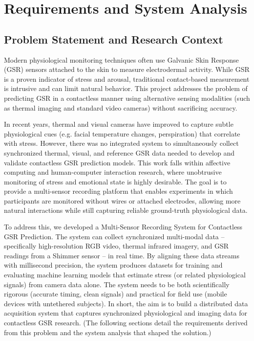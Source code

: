 \label{chap:3}
\chapter{Requirements and System Analysis}

\section{Problem Statement and Research Context}

Modern physiological monitoring techniques often use Galvanic Skin Response (GSR) sensors attached to the skin to measure electrodermal activity. While GSR is a proven indicator of stress and arousal, traditional contact-based measurement is intrusive and can limit natural behavior. This project addresses the problem of predicting GSR in a contactless manner using alternative sensing modalities (such as thermal imaging and standard video cameras) without sacrificing accuracy.

In recent years, thermal and visual cameras have improved to capture subtle physiological cues (e.g. facial temperature changes, perspiration) that correlate with stress. However, there was no integrated system to simultaneously collect synchronized thermal, visual, and reference GSR data needed to develop and validate contactless GSR prediction models. This work falls within affective computing and human-computer interaction research, where unobtrusive monitoring of stress and emotional state is highly desirable. The goal is to provide a multi-sensor recording platform that enables experiments in which participants are monitored without wires or attached electrodes, allowing more natural interactions while still capturing reliable ground-truth physiological data.

To address this, we developed a Multi-Sensor Recording System for Contactless GSR Prediction. The system can collect synchronized multi-modal data -- specifically high-resolution RGB video, thermal infrared imagery, and GSR readings from a Shimmer sensor -- in real time. By aligning these data streams with millisecond precision, the system produces datasets for training and evaluating machine learning models that estimate stress (or related physiological signals) from camera data alone. The system needs to be both scientifically rigorous (accurate timing, clean signals) and practical for field use (mobile devices with untethered subjects). In short, the aim is to build a distributed data acquisition system that captures synchronized physiological and imaging data for contactless GSR research. (The following sections detail the requirements derived from this problem and the system analysis that shaped the solution.)

